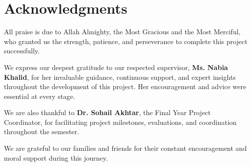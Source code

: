 \chapter*{Acknowledgments}

All praise is due to Allah Almighty, the Most Gracious and the Most Merciful, who granted us the strength, patience, and perseverance to complete this project successfully.

We express our deepest gratitude to our respected supervisor, \textbf{Ms. Nabia Khalid}, for her invaluable guidance, continuous support, and expert insights throughout the development of this project. Her encouragement and advice were essential at every stage.

We are also thankful to \textbf{Dr. Sohail Akhtar}, the Final Year Project Coordinator, for facilitating project milestones, evaluations, and coordination throughout the semester.

We are grateful to our families and friends for their constant encouragement and moral support during this journey.

\vspace{1.5cm} %


\vspace{0.5cm} %

